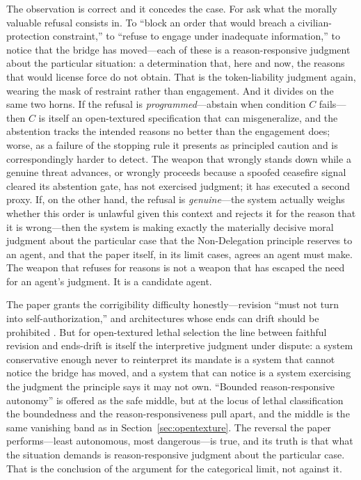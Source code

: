 \documentclass[11pt]{article}
\begin{document}
The observation is correct and it concedes the case. For ask what the morally valuable refusal consists in. To ``block an order that would breach a civilian-protection constraint,'' to ``refuse to engage under inadequate information,'' to notice that the bridge has moved---each of these is a reason-responsive judgment about the particular situation: a determination that, here and now, the reasons that would license force do not obtain. That is the token-liability judgment again, wearing the mask of restraint rather than engagement. And it divides on the same two horns. If the refusal is \emph{programmed}---abstain when condition $C$ fails---then $C$ is itself an open-textured specification that can misgeneralize, and the abstention tracks the intended reasons no better than the engagement does; worse, as a failure of the stopping rule it presents as principled caution and is correspondingly harder to detect. The weapon that wrongly stands down while a genuine threat advances, or wrongly proceeds because a spoofed ceasefire signal cleared its abstention gate, has not exercised judgment; it has executed a second proxy. If, on the other hand, the refusal is \emph{genuine}---the system actually weighs whether this order is unlawful given this context and rejects it for the reason that it is wrong---then the system is making exactly the materially decisive moral judgment about the particular case that the Non-Delegation principle reserves to an agent, and that the paper itself, in its limit cases, agrees an agent must make. The weapon that refuses for reasons is not a weapon that has escaped the need for an agent's judgment. It is a candidate agent.

The paper grants the corrigibility difficulty honestly---revision ``must not turn into self-authorization,'' and architectures whose ends can drift should be prohibited \citep{orseau2016, hadfieldmenell2017}. But for open-textured lethal selection the line between faithful revision and ends-drift is itself the interpretive judgment under dispute: a system conservative enough never to reinterpret its mandate is a system that cannot notice the bridge has moved, and a system that can notice is a system exercising the judgment the principle says it may not own. ``Bounded reason-responsive autonomy'' is offered as the safe middle, but at the locus of lethal classification the boundedness and the reason-responsiveness pull apart, and the middle is the same vanishing band as in Section~\ref{sec:opentexture}. The reversal the paper performs---least autonomous, most dangerous---is true, and its truth is that what the situation demands is reason-responsive judgment about the particular case. That is the conclusion of the argument for the categorical limit, not against it.
\end{document}
